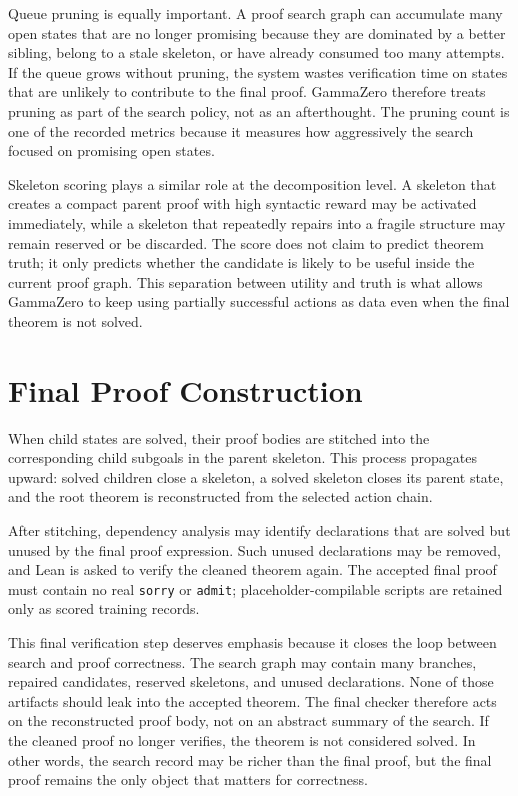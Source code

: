 Queue pruning is equally important. A proof search graph can accumulate many open states that are no
longer promising because they are dominated by a better sibling, belong to a stale skeleton, or have
already consumed too many attempts. If the queue grows without pruning, the system wastes verification
time on states that are unlikely to contribute to the final proof. GammaZero therefore treats pruning as
part of the search policy, not as an afterthought. The pruning count is one of the recorded metrics
because it measures how aggressively the search focused on promising open states.

Skeleton scoring plays a similar role at the decomposition level. A skeleton that creates a compact parent proof with high syntactic reward may be activated immediately, while a skeleton that repeatedly repairs into a
fragile structure may remain reserved or be discarded. The score does not claim to predict theorem
truth; it only predicts whether the candidate is likely to be useful inside the current proof graph. This
separation between utility and truth is what allows GammaZero to keep using partially successful actions
as data even when the final theorem is not solved.

\section{Final Proof Construction}

When child states are solved, their proof bodies are stitched into the corresponding child subgoals in the parent skeleton. This process propagates upward: solved children close a skeleton, a solved skeleton closes its parent state, and the root theorem is reconstructed from the selected action chain.

After stitching, dependency analysis may identify declarations that are solved but unused by the final proof expression. Such unused declarations may be removed, and Lean is asked to verify the cleaned theorem again. The accepted final proof must contain no real \texttt{sorry} or \texttt{admit}; placeholder-compilable scripts are retained only as scored training records.

This final verification step deserves emphasis because it closes the loop between search and proof
correctness. The search graph may contain many branches, repaired candidates, reserved skeletons, and
unused declarations. None of those artifacts should leak into the accepted theorem. The
final checker therefore acts on the reconstructed proof body, not on an abstract summary of the search.
If the cleaned proof no longer verifies, the theorem is not considered solved. In other words, the search
record may be richer than the final proof, but the final proof remains the only object that matters for
correctness.

